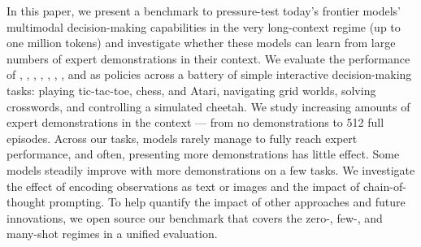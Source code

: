 In this paper, we present a benchmark to pressure-test today's frontier models' multimodal decision-making capabilities in the very long-context regime (up to one million tokens) and investigate whether these models can learn from large numbers of expert demonstrations in their context.
We evaluate the performance of \claude{}, \flash{}, \pro{}, \expflash{}, \gpt{}, \mini{}, \preview{}, and \oone{} as policies across a battery of simple interactive decision-making tasks: playing tic-tac-toe, chess, and Atari, navigating grid worlds, solving crosswords, and controlling a simulated cheetah.
We study increasing amounts of expert demonstrations in the context --- from no demonstrations to 512 full episodes.
Across our tasks, models rarely manage to fully reach expert performance, and often, presenting more demonstrations has little effect.
Some models steadily improve with more demonstrations on a few tasks.
We investigate the effect of encoding observations as text or images and the impact of chain-of-thought prompting.
To help quantify the impact of other approaches and future innovations,
we open source our benchmark that covers the zero-, few-, and many-shot regimes in a unified evaluation.

